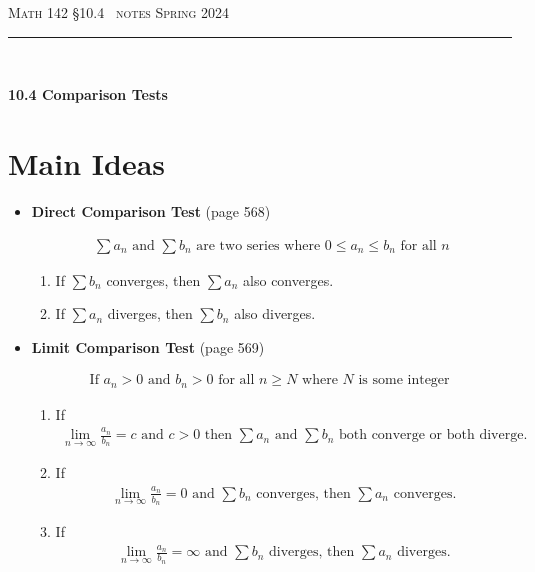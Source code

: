 \documentclass{article}
\def\chapt{10.4}
\begin{document}
\noindent
{\scshape Math 142} \hfill {\scshape \S\chapt~ notes} \hfill {\scshape Spring 2024}

\smallskip

\hrule

\bigskip

\hfill
\\

\thispagestyle{empty}

{
\huge
\noindent
\textbf{10.4 Comparison Tests}
}

\section*{Main Ideas}

\begin{itemize}

% 
%
%
%
\item
\textbf{Direct Comparison Test} (page 568)

\begin{gather*}
\sum a_n
\text{ and }
\sum b_n
\text{ are two series where }
0 \leq a_n \leq b_n
\text{ for all }
n
\end{gather*}

\begin{enumerate}
\item
If $\sum b_n$ converges, then $\sum a_n$ also converges.
\item
If $\sum a_n$ diverges, then $\sum b_n$ also diverges.
\end{enumerate}
\hfill
%
%
%
%
\item
\textbf{Limit Comparison Test} (page 569)

\begin{gather*}
\text{If }
a_n > 0
\text{ and }
b_n > 0
\text{ for all }
n \geq N
\text{ where $N$ is some integer }
\end{gather*}

\begin{enumerate}
\item
If
\begin{gather*}
\lim_{n\to\infty} \frac{a_n}{b_n}=c \text{ and } c>0
\text{ then }
\sum a_n
\text{ and }
\sum b_n
\text{ both converge or both diverge.}
\end{gather*}
\item

If
\begin{gather*}
\lim_{n\to\infty} \frac{a_n}{b_n}=0
\text{ and }
\sum b_n
\text{ converges, then }
\sum a_n
\text{ converges.}
\end{gather*}
\item

If
\begin{gather*}
\lim_{n\to\infty} \frac{a_n}{b_n}=\infty
\text{ and }
\sum b_n
\text{ diverges, then }
\sum a_n
\text{ diverges.}
\end{gather*}
\end{enumerate}

\end{itemize}
\end{document}
